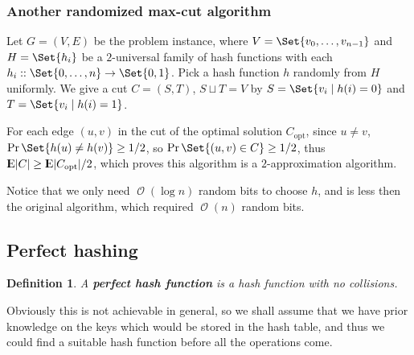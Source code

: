 \documentclass[12pt, a4paper]{article}
\DeclarePairedDelimiter{\abs}{\lvert}{\rvert}
\newcommand{\ord}{\operatorname{\mathcal{O}}}
\DeclareMathOperator{\Expect}{{\rm I\kern-.3em E}}
\theoremstyle{mystyle} %
\newtheorem{definition}{Definition}
\begin{document}
\subsubsection{Another randomized max-cut algorithm}
Let $G = (V, E)$ be the problem instance, where $V = \Set{v_0, \dots, v_{n-1}}$
and $H = \Set{ h_i }$ be a $2$-universal family of hash functions
with each $h_i :: \Set{0, \dots, n} \to \Set{0, 1}$.
Pick a hash function $h$ randomly from $H$ uniformly.
We give a cut $C = (S, T)$, $S \sqcup T = V$ by $S = \Set{ v_i \mid h(i) = 0}$
and $T = \Set{ v_i \mid h(i) = 1}$.

For each edge $(u, v)$ in the cut of the optimal solution $C_{\text{opt}}$,
since $u \neq v$, $\Pr\Set{ h(u) \neq h(v)} \geq 1/2$,
so $\Pr\Set{ (u, v) \in C} \geq 1/2$, thus $\Expect \abs{C} \geq \Expect \abs{C_{\text{opt}}} / 2$,
which proves this algorithm is a $2$-approximation algorithm.

Notice that we only need $\ord(\log n)$ random bits to choose $h$,
and is less then the original algorithm, which required $\ord(n)$ random bits.

\subsection{Perfect hashing}

\begin{definition}
  A {\bf perfect hash function} is a hash function with no collisions.
\end{definition}

Obviously this is not achievable in general, so we shall assume that
we have prior knowledge on the keys which would be stored in the hash table,
and thus we could find a suitable hash function before all the operations come.
\end{document}
